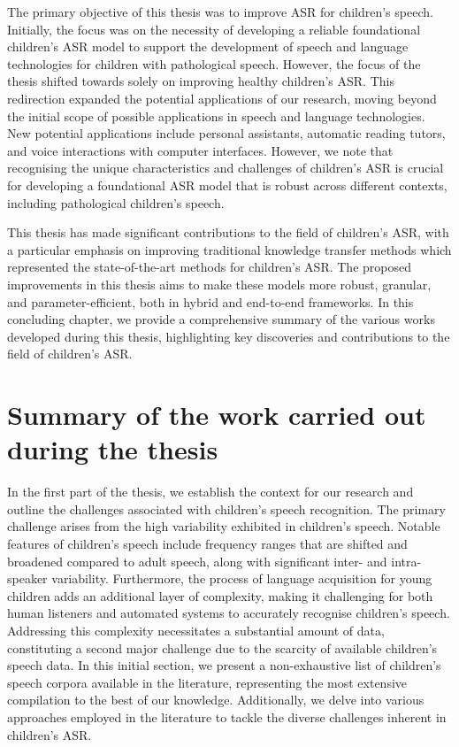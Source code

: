 \label{chap:8}
\cleardoublepage

The primary objective of this thesis was to improve ASR for children's speech. Initially, the focus was on the necessity of developing a reliable foundational children's ASR model to support the development of speech and language technologies for children with pathological speech. However, the focus of the thesis shifted towards solely on improving healthy children's ASR. This redirection expanded the potential applications of our research, moving beyond the initial scope of possible applications in speech and language technologies. New potential applications include personal assistants, automatic reading tutors, and voice interactions with computer interfaces. However, we note that recognising the unique characteristics and challenges of children's ASR is crucial for developing a foundational ASR model that is robust across different contexts, including pathological children's speech.

This thesis has made significant contributions to the field of children's ASR, with a particular emphasis on improving traditional knowledge transfer methods which represented the state-of-the-art methods for children's ASR. The proposed improvements in this thesis aims to make these models more robust, granular, and parameter-efficient, both in hybrid and end-to-end frameworks. In this concluding chapter, we provide a comprehensive summary of the various works developed during this thesis, highlighting key discoveries and contributions to the field of children's ASR.

\section{Summary of the work carried out during the thesis}
In the first part of the thesis, we establish the context for our research and outline the challenges associated with children's speech recognition. The primary challenge arises from the high variability exhibited in children's speech. Notable features of children's speech include frequency ranges that are shifted and broadened compared to adult speech, along with significant inter- and intra-speaker variability. Furthermore, the process of language acquisition for young children adds an additional layer of complexity, making it challenging for both human listeners and automated systems to accurately recognise children's speech. Addressing this complexity necessitates a substantial amount of data, constituting a second major challenge due to the scarcity of available children's speech data. In this initial section, we present a non-exhaustive list of children's speech corpora available in the literature, representing the most extensive compilation to the best of our knowledge. Additionally, we delve into various approaches employed in the literature to tackle the diverse challenges inherent in children's ASR.


